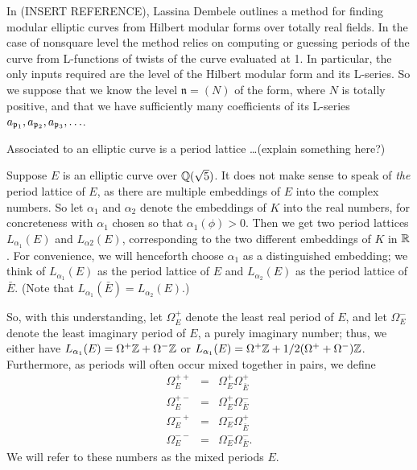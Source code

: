 \newcommand{\n}{\mathfrak{n}}
\newcommand{\ap}[1]{a_{\p_{#1}}}
\newcommand{\round}[1]{\left\lfloor{#1}\right\rceil}
\newcommand{\fc}{\mathfrak{c}}

In (INSERT REFERENCE), Lassina Dembele outlines a method for finding modular elliptic
curves from Hilbert modular forms over totally real fields. In the case of nonsquare level
the method relies on computing or guessing periods of the curve from L-functions of twists
of the curve evaluated at 1. In particular, the only inputs required are the level of the
Hilbert modular form and its L-series. So we suppose that we know the level $\n = (N)$ of the form,
where $N$ is totally positive,
and that we have sufficiently many coefficients of its L-series $\ap{1}, \ap{2}, \ap{3}, \ldots$.

Associated to an elliptic curve is a period lattice \ldots (explain something here?)

Suppose $E$ is an elliptic curve over $\mathbb{Q}(\sqrt 5)$. It does not make sense to speak of
\emph{the} period lattice of $E$, as there are multiple embeddings of $E$ into the complex
numbers. So let $\alpha_1$ and $\alpha_2$ denote the embeddings of $K$ into the real numbers,
for concreteness with $\alpha_1$ chosen so that $\alpha_1(\phi) > 0$. Then we get two period
lattices $L_{\alpha_1}(E)$ and $L_{\alpha 2}(E)$, corresponding to the two different embeddings
of $K$ in $\mathbb{R}$. For convenience, we will henceforth choose $\alpha_1$ as a distinguished embedding;
we think of $L_{\alpha_1}(E)$ as the period lattice of $E$ and $L_{\alpha_2}(E)$ as the period lattice
of $\bar E$. (Note that $L_{\alpha_1}(\bar E) = L_{\alpha_2}(E)$.)

\newcommand{\Omegap}{\Omega^+}
\newcommand{\Omegam}{\Omega^-}
\newcommand{\Omegapp}{\Omega^{++}}
\newcommand{\Omegapm}{\Omega^{+-}}
\newcommand{\Omegamp}{\Omega^{-+}}
\newcommand{\Omegamm}{\Omega^{--}}

So, with this understanding, let $\Omegap_E$ denote the least real period of $E$, and let
$\Omegam_E$ denote the least imaginary period of $E$, a purely imaginary number; thus, we either
have $L_{\alpha_1}(E) = \Omegap\Z + \Omegam\Z$ or $L_{\alpha_1}(E) = \Omegap\Z + 1/2(\Omegap + \Omegam)\Z$.
Furthermore,
as periods will often occur mixed together in pairs, we define
\begin{eqnarray*}
\Omegapp_E &=& \Omegap_E\Omegap_{\bar E} \\
\Omegapm_E &=& \Omegap_E\Omegam_{\bar E} \\
\Omegamp_E &=& \Omegam_E\Omegap_{\bar E} \\
\Omegamm_E &=& \Omegam_E\Omegam_{\bar E}.
\end{eqnarray*}
We will refer to these numbers as the mixed periods $E$.

